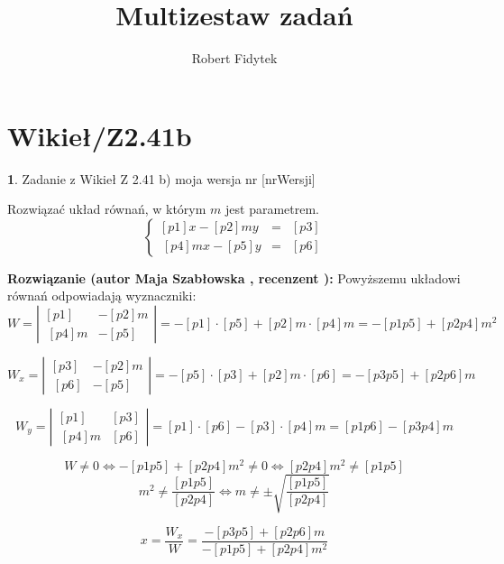 \documentclass[12pt, a4paper]{article}
\title{Multizestaw zadań}
\author{Robert Fidytek}
\date{}
\theoremstyle{definition} %
\newtheorem{zad}{}
\newcommand{\kategoria}[1]{\section{#1}} %
\newcommand{\zadStart}[1]{\begin{zad}#1\newline} %
\newcommand{\zadStop}{\end{zad}}   %
\newcommand{\rozwStart}[2]{\noindent \textbf{Rozwiązanie (autor #1 , recenzent #2): }\newline} %
\begin{document}
\maketitle


\kategoria{Wikieł/Z2.41b}
\zadStart{Zadanie z Wikieł Z 2.41 b)  moja wersja nr [nrWersji]}


Rozwiązać układ równań, w którym $m$ jest parametrem.
$$\left\{\begin{array}{ccc}
[p1]x-[p2]my&=&[p3]\\
\ [p4]mx-[p5]y&=&[p6]
\end{array} \right.$$

\zadStop
\rozwStart{Maja Szabłowska}{}
Powyższemu układowi równań odpowiadają wyznaczniki:
$$W=\left| \begin{array}{lccr} [p1] & -[p2]m \\ \ [p4]m & -[p5] \end{array}\right| = -[p1]\cdot[p5] + [p2]m\cdot[p4]m=-[p1p5]+[p2p4]m^{2}$$

$$W_{x}=\left| \begin{array}{lccr} [p3] & -[p2]m \\ \ [p6] & -[p5] \end{array}\right| = -[p5]\cdot[p3] + [p2]m\cdot[p6]=-[p3p5]+[p2p6]m$$

$$W_{y}=\left| \begin{array}{lccr} [p1] & [p3] \\ \ [p4]m & [p6] \end{array}\right| = [p1]\cdot[p6] - [p3]\cdot[p4]m=[p1p6]-[p3p4]m$$

$$W\neq 0 \iff -[p1p5]+[p2p4]m^{2}\neq 0 \iff [p2p4]m^{2}\neq[p1p5] $$
$$m^{2}\neq \frac{[p1p5]}{[p2p4]} \iff m\neq \pm \sqrt{\frac{[p1p5]}{[p2p4]} }$$

$$x=\frac{W_{x}}{W}=\frac{-[p3p5]+[p2p6]m}{-[p1p5]+[p2p4]m^{2}}$$
\end{document}

